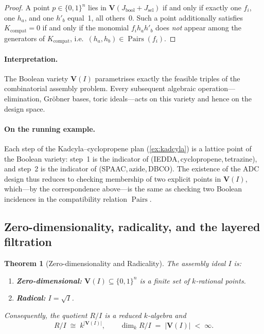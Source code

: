 \documentclass[preprint,12pt]{elsarticle}
\newtheorem{theorem}{Theorem}[section]
\theoremstyle{definition}
\theoremstyle{remark}
\newcommand{\kk}{k}
\newcommand{\Var}{\mathbf{V}}
\DeclareMathOperator{\Pairs}{Pairs}
\begin{document}
\begin{proof}
A point $p \in \{0,1\}^n$ lies in $\Var(J_{\mathrm{bool}} + J_{\mathrm{sel}})$
if and only if exactly one $f_i$, one $h_a$, and one $h'_b$ equal~1,
all others~0.  Such a point additionally satisfies $K_{\mathrm{compat}} = 0$
if and only if the monomial $f_i h_a h'_b$ does \emph{not} appear among
the generators of $K_{\mathrm{compat}}$, i.e.\
$(h_a, h_b) \in \Pairs(f_i)$.
\end{proof}

\paragraph{Interpretation.}
The Boolean variety $\Var(I)$ parametrises exactly the feasible
triples of the combinatorial assembly problem.
Every subsequent algebraic operation---elimination, Gr\"obner
bases, toric ideals---acts on this variety and hence on the
design space.

\paragraph{On the running example.}
Each step of the Kadcyla--cyclopropene plan
(\cref{ex:kadcyla}) is a lattice point of the Boolean variety:
step~1 is the indicator of
(IEDDA,\,cyclopropene,\,tetrazine), and step~2 is the indicator
of (SPAAC,\,azide,\,DBCO).  The existence of the ADC design thus
reduces to checking membership of two explicit points in
$\Var(I)$, which---by the correspondence above---is the same as
checking two Boolean incidences in the compatibility relation
$\Pairs$.


\subsection{Zero-dimensionality, radicality, and the layered filtration}

\begin{theorem}[Zero-dimensionality and Radicality]\label{thm:radical}
\label{prop:zero-dim}%
The assembly ideal $I$ is:
\begin{enumerate}[nosep,label=(\alph*)]
\item \textbf{Zero-dimensional:} $\Var(I) \subseteq \{0,1\}^n$ is a
  finite set of $\kk$-rational points.
\item \textbf{Radical:} $I = \sqrt{I}$.
\end{enumerate}
Consequently, the quotient $R/I$ is a reduced $\kk$-algebra and
\[
  R/I \;\cong\; \kk^{|\Var(I)|}, \qquad
  \dim_\kk R/I \;=\; |\Var(I)| \;<\; \infty.
\]
\end{theorem}
\end{document}
